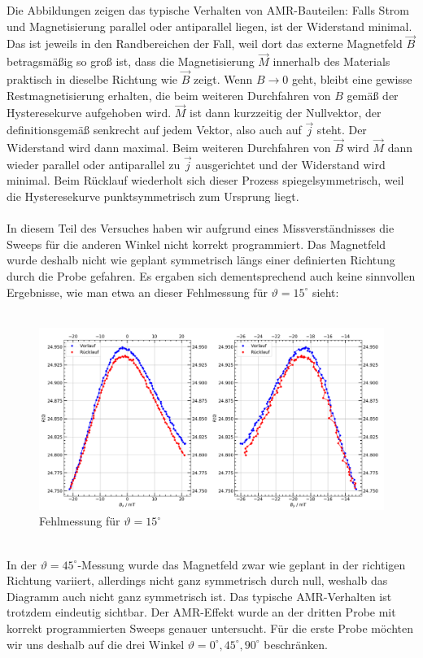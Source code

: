 \documentclass[german,  %
parskip=full,  %
]{scrartcl}
\begin{document}
Die Abbildungen zeigen das typische Verhalten von AMR-Bauteilen: Falls Strom und Magnetisierung parallel oder antiparallel liegen, ist der Widerstand minimal. Das ist jeweils in den Randbereichen der Fall, weil dort das externe Magnetfeld \(\vec{B}\) betragsmäßig so groß ist, dass die Magnetisierung \(\vec{M}\) innerhalb des Materials praktisch in dieselbe Richtung wie \(\vec{B}\) zeigt. Wenn \(B\rightarrow 0\) geht, bleibt eine gewisse Restmagnetisierung erhalten, die beim weiteren Durchfahren von \(B\) gemäß der Hysteresekurve aufgehoben wird. \(\vec{M}\) ist dann kurzzeitig der Nullvektor, der definitionsgemäß senkrecht auf jedem Vektor, also auch auf \(\vec{j}\) steht. Der Widerstand wird dann maximal. Beim weiteren Durchfahren von \(\vec{B}\) wird \(\vec{M}\) dann wieder parallel oder antiparallel zu \(\vec{j}\) ausgerichtet und der Widerstand wird minimal. Beim Rücklauf wiederholt sich dieser Prozess spiegelsymmetrisch, weil die Hysteresekurve punktsymmetrisch zum Ursprung liegt. \\\\
In diesem Teil des Versuches haben wir aufgrund eines Missverständnisses die Sweeps für die anderen Winkel nicht korrekt programmiert. Das Magnetfeld wurde deshalb nicht wie geplant symmetrisch längs einer definierten Richtung durch die Probe gefahren. Es ergaben sich dementsprechend auch keine sinnvollen Ergebnisse, wie man etwa an dieser Fehlmessung für \(\vartheta=15^{\circ}\) sieht: \\\\
\begin{figure}[h!]\centering
\includegraphics[width=\textwidth]{Probe1_15_Grad.png}
\caption{Fehlmessung für \(\vartheta=15^{\circ}\)}
\end{figure} \\
In der \(\vartheta = 45^{\circ}\)-Messung wurde das Magnetfeld zwar wie geplant in der richtigen Richtung variiert, allerdings nicht ganz symmetrisch durch null, weshalb das Diagramm auch nicht ganz symmetrisch ist. Das typische AMR-Verhalten ist trotzdem eindeutig sichtbar. Der AMR-Effekt wurde an der dritten Probe mit korrekt programmierten Sweeps genauer untersucht. Für die erste Probe möchten wir uns deshalb auf die drei Winkel \(\vartheta=0^{\circ},45^{\circ},90^{\circ}\) beschränken. 
\end{document}
